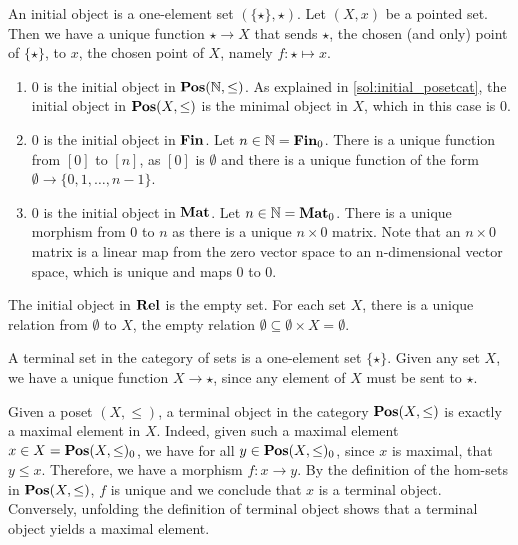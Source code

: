\begin{solution}\label{sol:initial_pointset}
	An initial object is a one-element set $ (\{ \star \}, \star) $. Let $ (X, x) $ be a pointed set. Then we have a unique function $ \star \to X $ that sends $ \star $, the chosen (and only) point of $ \{ \star \} $, to $ x $, the chosen point of $ X $, namely $ f: \star \mapsto x $.
\end{solution}

\begin{solution}\label{sol:initial_cats_of_nats}
\begin{enumerate}
	\item $0$ is the initial object in $\mathbf{Pos}(\mathbb{N},\leq)$. As explained in \cref{sol:initial_posetcat}, the initial object in $\mathbf{Pos}(X,\leq)$ is the minimal object in $X$, which in this case is $0$.
	\item $0$ is the initial object in $\mathbf{Fin}$. Let $n \in \mathbb{N} = \mathbf{Fin}_0$. There is a unique function from $[0]$ to $[n]$, as $[0]$ is $\emptyset$ and there is a unique function of the form $\emptyset \to \{0, 1, \dots, n-1\}$.
	\item $0$ is the initial object in $\mathbf{Mat}$. Let $n \in \mathbb{N} = \mathbf{Mat}_0$. There is a unique morphism from $0$ to $n$ as there is a unique $n \times 0$ matrix. 
     Note that an $n \times 0$ matrix is a linear map from the zero vector space to an n-dimensional vector space, which is unique and maps 0 to 0. 
\end{enumerate}
\end{solution}

\begin{solution} \label{sol:initial_rel}
	The initial object in $\mathbf{Rel}$ is the empty set. For each set $X$, there is a unique relation from $\emptyset$ to $X$, the empty relation $\emptyset \subseteq \emptyset \times X = \emptyset$.
\end{solution}

\begin{solution}\label{sol:terminal_set}
	A terminal set in the category of sets is a one-element set $ \{ \star \} $. Given any set $ X $, we have a unique function $ X \to \star $, since any element of $ X $ must be sent to $ \star $.
\end{solution}

\begin{solution}\label{sol:terminal_posetcat}
	Given a poset $ (X, \leq) $, a terminal object in the category $ \mathbf{Pos}(X, \leq) $ is exactly a maximal element in $ X $. Indeed, given such a maximal element $ x \in X = \mathbf{Pos}(X, \leq)_0 $, we have for all $ y \in \mathbf{Pos}(X, \leq)_0 $, since $ x $ is maximal, that $ y \leq x $. Therefore, we have a morphism $ f: x \to y $. By the definition of the hom-sets in $ \mathbf{Pos}(X, \leq) $, $ f $ is unique and we conclude that $ x $ is a terminal object.
	Conversely, unfolding the definition of terminal object shows that a terminal object yields a maximal element.
\end{solution}

